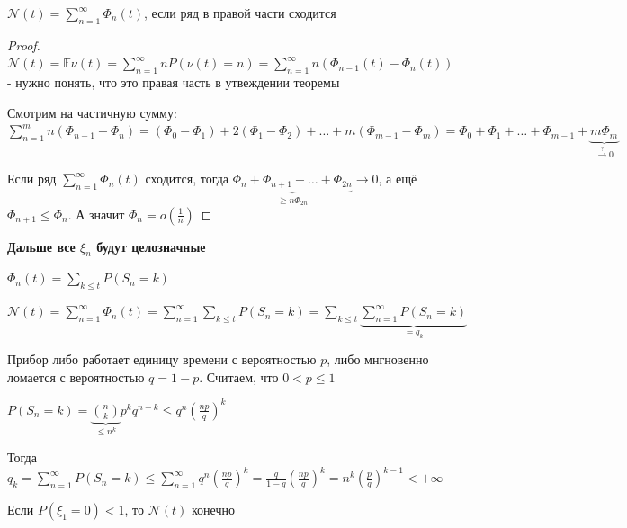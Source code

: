 \begin{theorem}
    $\mathcal{N} (t) = \sum\limits_{n = 1}^{\infty} \Phi_n (t)$, если ряд в правой части сходится
\end{theorem}

\begin{proof}
    $\mathcal{N} (t) = \mathbb{E} \nu (t) = \sum\limits_{n = 1}^\infty n P(\nu (t) = n) = \sum\limits_{n = 1}^\infty n (\Phi_{n - 1} (t) - \Phi_n (t))$ - нужно понять, что это правая часть в утвеждении теоремы

    Смотрим на частичную сумму: $\sum\limits_{n = 1}^m n (\Phi_{n - 1} - \Phi_n) = (\Phi_0 - \Phi_1) + 2 (\Phi_1 - \Phi_2) + \ldots + m (\Phi_{m - 1} - \Phi_m) = \Phi_0 + \Phi_1 + \ldots + \Phi_{m-1} + \underbrace{m\Phi_m}_{\overset{?}{\rightarrow} 0}$

    Если ряд $\sum\limits_{n = 1}^\infty \Phi_n (t)$ сходится, тогда $\underbrace{\Phi_n + \Phi_{n+1} + \ldots + \Phi_{2n}}_{\geqslant n \Phi_{2n}} \rightarrow 0$, а ещё $\Phi_{n + 1} \leqslant \Phi_n$. А значит $\Phi_n = o \left( \frac{1}{n} \right)$
\end{proof}

\textbf{Дальше все $\xi_n$ будут целозначные}

\begin{remark}
    $\Phi_n (t) = \sum\limits_{k \leqslant t} P(S_n = k)$

    $\mathcal{N} (t) = \sum\limits_{n=1}^\infty \Phi_n (t) = \sum\limits_{n = 1}^\infty \sum\limits_{k \leqslant t} P(S_n = k) = \sum\limits_{k \leqslant t} \underbrace{\sum\limits_{n = 1}^\infty P(S_n = k)}_{=q_k}$
\end{remark}

\begin{example}
    Прибор либо работает единицу времени с вероятностью $p$, либо мнгновенно ломается с вероятностью $q = 1 - p$. Считаем, что $0 < p \leqslant 1$

    $P(S_n = k) = \underbrace{\binom{n}{k}}_{\leqslant n^k} p^k q^{n - k} \leqslant q^n \left( \frac{np}{q} \right)^k$

    Тогда $q_k = \sum\limits_{n = 1}^\infty P(S_n = k) \leqslant \sum\limits_{n=1}^\infty q^n \left( \frac{np}{q} \right)^k = \frac{q}{1 - q} \left( \frac{np}{q} \right)^k = n^k \left(\frac{p}{q}\right)^{k - 1} < +\infty$
\end{example}

\begin{theorem}
    Если $P(\xi_1 = 0) < 1$, то $\mathcal{N} (t)$ конечно
\end{theorem}

